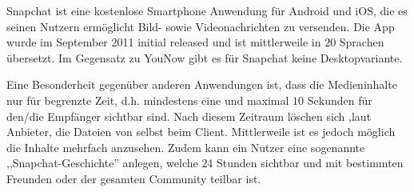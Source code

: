 Snapchat ist eine kostenlose Smartphone Anwendung f\"ur Android und iOS, die es
seinen Nutzern erm\"oglicht Bild- sowie Videonachrichten zu versenden. Die App
wurde im September 2011 initial released und ist mittlerweile in $20$ Sprachen
\"ubersetzt. Im Gegensatz zu YouNow gibt es f\"ur Snapchat keine
Desktopvariante.

Eine Besonderheit gegen\"uber anderen Anwendungen ist, dass die Medieninhalte
nur f\"ur begrenzte Zeit, d.h. mindestens eine und maximal $10$ Sekunden
f\"ur den/die Empf\"anger sichtbar sind. Nach diesem Zeitraum l\"oschen sich
,laut Anbieter, die Dateien von selbst beim Client. Mittlerweile ist es jedoch
m\"oglich die Inhalte mehrfach anzusehen. Zudem kann ein Nutzer eine sogenannte
,,Snapchat-Geschichte'' anlegen, welche $24$ Stunden sichtbar und mit
bestimmten Freunden oder der gesamten Community teilbar ist.

